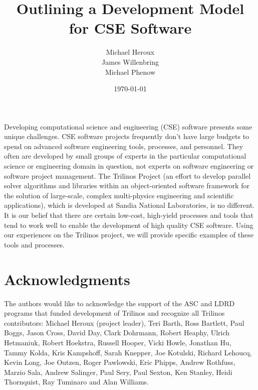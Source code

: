 \documentclass[12pt,relax]{article}
\title{Outlining a Development Model for CSE Software}
\author{
Michael Heroux\\
James Willenbring\\
Michael Phenow\\
}
\date{\today} %
\begin{document}
\maketitle



Developing computational science and engineering (CSE) software presents some 
unique challenges.  CSE software projects frequently don't have large budgets 
to spend on advanced software engineering tools, processes, and personnel.  
They often are developed by small groups of experts in the particular 
computational science or engineering domain in question, not experts on 
software engineering or software project management.  The Trilinos Project
(an effort to develop parallel solver algorithms and libraries within an
object-oriented software framework for the solution of large-scale, complex
multi-physics engineering and scientific applications), which is developed at
Sandia National Laboratories, is no different.  It is our belief that 
there are certain low-cost, high-yield processes and tools that tend to work 
well to enable the development of high quality CSE software.  Using our
experiences on the Trilinos project, we will provide specific examples of
these tools and processes.


\clearpage


\section*{Acknowledgments}

The authors would like to acknowledge the support of the ASC and LDRD programs 
that funded development of Trilinos and recognize all Trilinos contributors:
Michael Heroux (project leader), Teri Barth, Ross Bartlett, Paul Boggs, Jason
Cross, David Day, Clark Dohrmann, Robert Heaphy, Ulrich Hetmaniuk, Robert
Hoekstra, Russell Hooper, Vicki Howle, Jonathan Hu, Tammy Kolda, Kris
Kampshoff, Sarah Knepper, Joe Kotulski, Richard Lehoucq, Kevin Long, Joe
Outzen, Roger Pawlowski, Eric Phipps, Andrew Rothfuss, Marzio Sala, Andrew
Salinger, Paul Sery, Paul Sexton, Ken Stanley, Heidi Thornquist, Ray Tuminaro
and Alan Williams.
\end{document}
